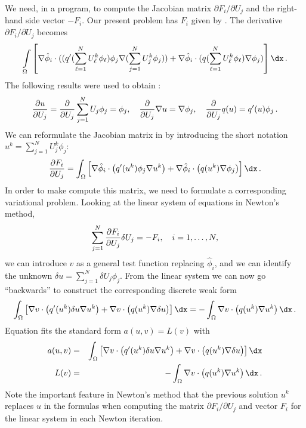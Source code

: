 We need, in a program, to compute the Jacobian
matrix $\partial F_i/\partial U_j$
and the right-hand side vector $-F_i$.
Our present problem has $F_i$ given by .
The derivative $\partial F_i/\partial U_j$ becomes
\begin{equation}
\int\limits_\Omega \left\lbrack
\nabla \hat\phi_i\cdot(( q'(\sum_{\ell=1}^NU_\ell^k\phi_\ell)\phi_j
\nabla (\sum_{j=1}^NU_j^k\phi_j))
+
\nabla \hat\phi_i\cdot ( q(\sum_{\ell=1}^NU_\ell^k\phi_\ell)
\nabla \phi_j )
\right\rbrack
\dx\langtangenep
\label{langtangen:poisson:nonlinear:dFdU}
\end{equation}
The following results were used to obtain :
\begin{equation}
{\partial u\over\partial U_j} = {\partial\over\partial U_j}
\sum_{j=1}^NU_j\phi_j = \phi_j,\quad {\partial\over\partial U_j}\nabla u = \nabla\phi_j,\quad {\partial\over\partial U_j}q(u) = q'(u)\phi_j\thinspace .
\end{equation}
We can reformulate the Jacobian matrix
in  by introducing the short
notation $u^k = \sum_{j=1}^NU_j^k\phi_j$:
\begin{equation}
{\partial F_i\over\partial U_j} =
\int_\Omega \left\lbrack
\nabla \hat\phi_i\cdot\left( q'(u^k)\phi_j
\nabla u^k \right)
+
\nabla \hat\phi_i\cdot\left( q(u^k)
\nabla \phi_j \right)
\right\rbrack
\dx\langtangenep
\end{equation}
In order to make \fenics{} compute this matrix, we need to formulate a
corresponding variational problem. Looking at the
linear system of equations in Newton's method,
\[ \sum_{j=1}^N {\partial F_i\over\partial U_j}\delta U_j = -F_i,\quad
i=1,\ldots,N,\]
we can introduce $v$ as a general test function replacing $\hat\phi_i$,
and we can identify the unknown
$\delta u = \sum_{j=1}^N\delta U_j\phi_j$. From the linear system
we can now go ``backwards'' to construct the corresponding
discrete weak form
\begin{equation}
\label{langtangen:nonlinear:Newton:aLF}
\int_\Omega \left\lbrack
\nabla v\cdot\left( q'(u^k)\delta u
\nabla u^k \right)
+
\nabla v\cdot\left( q(u^k)
\nabla \delta u \right)
\right\rbrack
\dx = - \int_\Omega \nabla v\cdot\left( q(u^k)
\nabla u^k\right) \dx\langtangenep
\end{equation}
Equation  fits the standard form
$a(u,v)=L(v)$ with
\begin{eqnarray*}
a(u,v) &=&
\int_\Omega \left\lbrack
\nabla v\cdot\left( q'(u^k)\delta u
\nabla u^k \right)
+
\nabla v\cdot\left( q(u^k)
\nabla \delta u \right)
\right\rbrack
\dx\\
L(v) &=& - \int_\Omega \nabla v\cdot\left( q(u^k)
\nabla u^k\right) \dx\langtangenep
\end{eqnarray*}
Note the important feature in Newton's method
that the
previous solution $u^k$ replaces $u$
in the formulas when computing the matrix
$\partial F_i/\partial U_j$ and vector $F_i$ for the linear system in
each Newton iteration.

